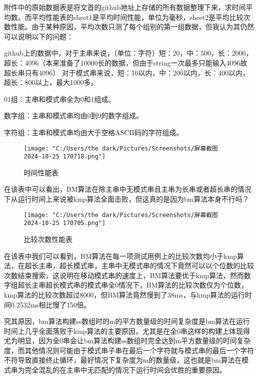 \documentclass[12pt]{article}
\begin{document}
附件中的原始数据表是将文首的github地址上存储的所有数据整理下来，求时间平均数。而平均性能表的sheet1是平均时间性能，单位为毫秒，sheet2是平均比较次数性能。由于某种原因，平均次数只测了每个组别的第一组数据，但我认为其仍然可以说明以下的问题：

github上的数据中，对于主串来说，（单位：字符）短：20，中：500，长：2000，超长：4096（本来准备了10000长的数据，但由于string一次最多只能输入4096故超长串只有4096）
对于模式串来说，短：10以内，中：200以内，长：400以内，超长：800以上，最大1000多。

01组：主串和模式串全为0和1组成。

数字组：主串和模式串均由0到9的数字组成。

字符组：主串和模式串均由大于空格ASCII码的字符组成。

\begin{figure}[h]
	
	\centering
	\texttt{[image: "C:/Users/the dark/Pictures/Screenshots/屏幕截图 2024-10-25 170718.png"]}
	\caption{时间性能表}
	\label{fig:enter-label}
	
\end{figure}

在该表中可以看出，BM算法在除主串中无模式串且主串为长串或者超长串的情况下从运行时间上来说被kmp算法全面击败，但这真的是因为bm算法本身不行吗？

\begin{figure}[h]
	
	\centering
	\texttt{[image: "C:/Users/the dark/Pictures/Screenshots/屏幕截图 2024-10-25 170705.png"]}
	\caption{比较次数性能表}
	\label{fig:enter-label}
	
\end{figure}

在该表中我们可以看到，BM算法在每一项测试用例上的比较次数均小于kmp算法，在超长主串，超长模式串，主串中无模式串的情况下竟然可以以个位数的比较次数结束搜索，这说明在移动模式串的速度上，BM算法要优于kmp算法，然而数字组超长主串超长模式串的模式串全0情况下，BM算法的比较次数仅为个位数，kmp算法的比较次数超过8000，但BM算法竟然慢到了38ms，与kmp算法的运行时间0.2532ms相比慢了150倍。

究其原因，bm算法构建ss数组时的m的平方数量级的时间复杂度是bm算法在运行时间上几乎全面落败于kmp算法的主要原因，尤其是在全0串这样的构建上体现得尤为明显，因为全0串会让bm算法构建ss数组时完全达到m平方数量级的时间复杂度，而其他情况则可能由于模式串子串在最后一个字符就与模式串的最后一个字符不符导致直接终止循环，最好情况下复杂度为m的数量级，这也就是bm算法在模式串为完全混乱的在主串中无匹配的情况下运行时间会优胜的重要原因。
\end{document}

